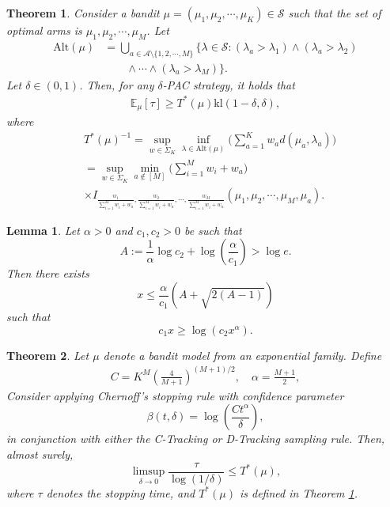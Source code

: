 \documentclass[10pt,a4paper]{amsart}
\newtheorem{theorem}{Theorem}
\newtheorem{lemma}{Lemma}
\newcommand{\bbE}{\mathbb{E}}
\newcommand{\calA}{\mathcal{A}}
\newcommand{\calS}{\mathcal{S}}
\newcommand{\nn}{\nonumber}
\begin{document}
\begin{theorem} \label{thm:lowbound} Consider a bandit $\mu=(\mu_1,\mu_2,\cdots, \mu_K) \in \calS$ such that the set of optimal arms is $\mu_1,\mu_2,\cdots,\mu_M$. 
Let
\begin{align}
\text{Alt}(\mu)&=\bigcup_{a\in \calA \setminus \{1,2,\cdots,M\}}\big\{\lambda \in \calS: (\lambda_a > \lambda_1) \wedge (\lambda_a >\lambda_2) \nn\\
&\qquad \wedge \cdots \wedge (\lambda_a>\lambda_M)\}. 
\end{align}
Let $\delta \in (0,1)$. Then, for any $\delta$-PAC strategy, it holds that
\begin{align}
\bbE_{\mu} [\tau]\geq T^*(\mu) \text{kl}(1-\delta, \delta),
\end{align} where
\begin{align}
&T^*(\mu)^{-1}=\sup_{w \in \Sigma_K} \inf_{\lambda \in \text{Alt}(\mu)} \bigg(\sum_{a=1}^K w_a d(\mu_a,\lambda_a)\bigg)\label{eqtami1} \\
&=\sup_{w \in \Sigma_K}\min_{a \notin [M]} \bigg(\sum_{i=1}^M w_i+w_a\bigg)\nn\\
& \times I_{\frac{w_1}{\sum_{i=1}^M w_i+w_a}, \frac{w_2}{\sum_{i=1}^M w_i+w_a}, \cdots, \frac{w_M}{\sum_{i=1}^M w_i +w_a}}(\mu_1,\mu_2,\cdots, \mu_M, \mu_a) \label{eqtami2}. 
\end{align}
\end{theorem}

\begin{lemma} \label{easy:lem} 
Let \( \alpha > 0 \) and \( c_1, c_2 > 0 \) be such that
\[
A := \frac{1}{\alpha} \log c_2 + \log \left( \frac{\alpha}{c_1} \right) > \log e.
\]
Then there exists
\[
x \leq \frac{\alpha}{c_1} \left( A + \sqrt{2(A - 1)} \right)
\]
such that
\[
c_1 x \geq \log(c_2 x^{\alpha}).
\]
\end{lemma}

\begin{theorem}
Let $\mu$ denote a bandit model from an exponential family. Define
\begin{align*}
C = K^M \left( \frac{4}{M+1} \right)^{(M+1)/2}, \quad \alpha = \frac{M+1}{2},
\end{align*}
Consider applying Chernoff's stopping rule with confidence parameter 
\[
\beta(t, \delta) = \log \left( \frac{C t^{\alpha}}{\delta} \right),
\]
in conjunction with either the C-Tracking or D-Tracking sampling rule. Then, almost surely,
\[
\limsup_{\delta \to 0} \frac{\tau}{\log(1/\delta)} \leq T^*(\mu),
\]
where $\tau$ denotes the stopping time, and $T^*(\mu)$ is defined in Theorem \ref{thm:lowbound}.
\end{theorem}
\end{document}
